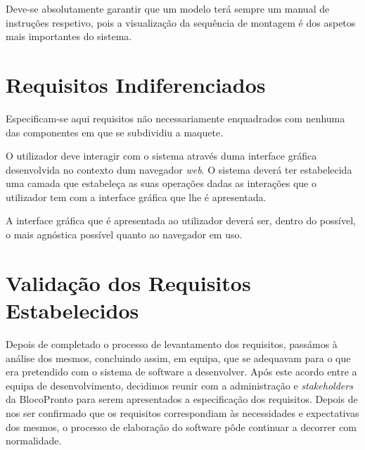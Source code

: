             {Deve-se absolutamente garantir que um modelo terá sempre um manual de instruções respetivo, pois a visualização da sequência de montagem é dos aspetos mais importantes do sistema.}

    \newpage
    \section{Requisitos Indiferenciados}

    Especificam-se aqui requisitos não necessariamente enquadrados com nenhuma das componentes em que se subdividiu a maquete.

            {O utilizador deve interagir com o sistema através duma interface gráfica desenvolvida no contexto dum navegador \textit{web}.}
            {O sistema deverá ter estabelecida uma camada que estabeleça as suas operações dadas as interações que o utilizador tem com a interface gráfica que lhe é apresentada.}

            {A interface gráfica que é apresentada ao utilizador deverá ser, dentro do possível, o mais agnóstica possível quanto ao navegador em uso.}

    \newpage
    \section{Validação dos Requisitos Estabelecidos}

    Depois de completado o processo de levantamento dos requisitos, passámos à análise dos mesmos, concluindo assim, em equipa, que se adequavam para o que era pretendido com o sistema de software a desenvolver.
    Após este acordo entre a equipa de desenvolvimento, decidimos reunir com a administração e \textit{stakeholders} da BlocoPronto para serem apresentados a especificação dos requisitos. Depois de nos ser confirmado que os requisitos correspondiam às necessidades e expectativas dos mesmos, o processo de elaboração do software pôde continuar a decorrer com normalidade.
    
            

